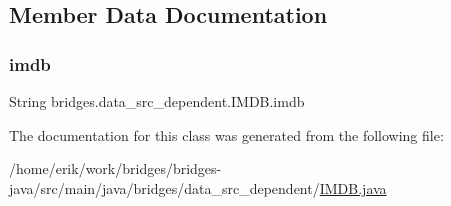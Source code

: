 \subsection{Member Data Documentation}
\mbox{\label{classbridges_1_1data__src__dependent_1_1_i_m_d_b_a2913407abe6019a396d4a2ac086283df}} 
\subsubsection{\texorpdfstring{imdb}{imdb}}
{\footnotesize\ttfamily String bridges.\+data\+\_\+src\+\_\+dependent.\+I\+M\+D\+B.\+imdb\hspace{0.3cm}{\ttfamily [protected]}}



The documentation for this class was generated from the following file\+:\begin{DoxyCompactItemize}
\item 
/home/erik/work/bridges/bridges-\/java/src/main/java/bridges/data\+\_\+src\+\_\+dependent/\hyperlink{_i_m_d_b_8java}{I\+M\+D\+B.\+java}\end{DoxyCompactItemize}
